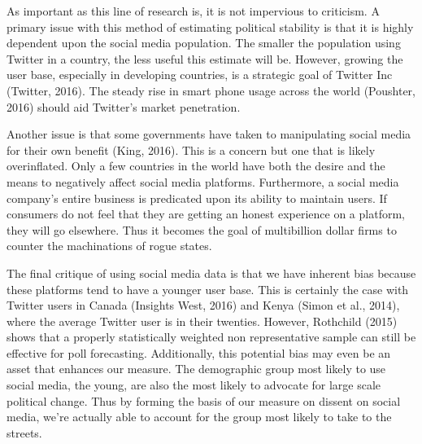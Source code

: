\documentclass[12pt]{article}
\begin{document}
\begin{spacing}{1.5}

As important as this line of research is, it is not impervious to criticism. A primary issue with this method of estimating political stability is that it is highly dependent upon the social media population. The smaller the population using Twitter in a country, the less useful this estimate will be. However, growing the user base, especially in developing countries, is a strategic goal of Twitter Inc (Twitter, 2016). The steady rise in smart phone usage across the world (Poushter, 2016) should aid Twitter's market penetration. 

Another issue is that some governments have taken to manipulating social media for their own benefit (King, 2016). This is a concern but one that is likely overinflated. Only a few countries in the world have both the desire and the means to negatively affect social media platforms. Furthermore, a social media company's entire business is predicated upon its ability to maintain users. If consumers do not feel that they are getting an honest experience on a platform, they will go elsewhere. Thus it becomes the goal of multibillion dollar firms to counter the machinations of rogue states. 

The final critique of using social media data is that we have inherent bias because these platforms tend to have a younger user base. This is certainly the case with Twitter users in Canada (Insights West, 2016) and Kenya (Simon et al., 2014), where the average Twitter user is in their twenties. However, Rothchild (2015) shows that a properly statistically weighted non representative sample can still be effective for poll forecasting. Additionally, this potential bias may even be an asset that enhances our measure. The demographic group most likely to use social media, the young, are also the most likely to advocate for large scale political change. Thus by forming the basis of our measure on dissent on social media, we're actually able to account for the group most likely to take to the streets.



\end{spacing}
\end{document}
